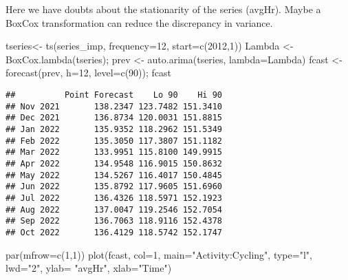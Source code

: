 \documentclass[
]{article}
\newenvironment{Shaded}{\begin{snugshade}}{\end{snugshade}}
\newcommand{\AttributeTok}[1]{\textcolor[rgb]{0.77,0.63,0.00}{#1}}
\newcommand{\DecValTok}[1]{\textcolor[rgb]{0.00,0.00,0.81}{#1}}
\newcommand{\FunctionTok}[1]{\textcolor[rgb]{0.00,0.00,0.00}{#1}}
\newcommand{\NormalTok}[1]{#1}
\newcommand{\OtherTok}[1]{\textcolor[rgb]{0.56,0.35,0.01}{#1}}
\newcommand{\StringTok}[1]{\textcolor[rgb]{0.31,0.60,0.02}{#1}}
\begin{document}
Here we have doubts about the stationarity of the series (avgHr). Maybe
a BoxCox transformation can reduce the discrepancy in variance.

\begin{Shaded}
\begin{Highlighting}[]
\NormalTok{tseries}\OtherTok{\textless{}{-}} \FunctionTok{ts}\NormalTok{(series\_imp, }\AttributeTok{frequency=}\DecValTok{12}\NormalTok{, }\AttributeTok{start=}\FunctionTok{c}\NormalTok{(}\DecValTok{2012}\NormalTok{,}\DecValTok{1}\NormalTok{))}
\NormalTok{Lambda }\OtherTok{\textless{}{-}} \FunctionTok{BoxCox.lambda}\NormalTok{(tseries); }
\NormalTok{prev }\OtherTok{\textless{}{-}} \FunctionTok{auto.arima}\NormalTok{(tseries, }\AttributeTok{lambda=}\NormalTok{Lambda) }
\NormalTok{fcast }\OtherTok{\textless{}{-}} \FunctionTok{forecast}\NormalTok{(prev, }\AttributeTok{h=}\DecValTok{12}\NormalTok{, }\AttributeTok{level=}\FunctionTok{c}\NormalTok{(}\DecValTok{90}\NormalTok{)); fcast}
\end{Highlighting}
\end{Shaded}

\begin{verbatim}
##          Point Forecast    Lo 90    Hi 90
## Nov 2021       138.2347 123.7482 151.3410
## Dec 2021       136.8734 120.0031 151.8815
## Jan 2022       135.9352 118.2962 151.5349
## Feb 2022       135.3050 117.3807 151.1182
## Mar 2022       133.9951 115.8100 149.9915
## Apr 2022       134.9548 116.9015 150.8632
## May 2022       134.5267 116.4017 150.4845
## Jun 2022       135.8792 117.9605 151.6960
## Jul 2022       136.4326 118.5971 152.1923
## Aug 2022       137.0047 119.2546 152.7054
## Sep 2022       136.7063 118.9116 152.4378
## Oct 2022       136.4129 118.5742 152.1747
\end{verbatim}

\begin{Shaded}
\begin{Highlighting}[]
\FunctionTok{par}\NormalTok{(}\AttributeTok{mfrow=}\FunctionTok{c}\NormalTok{(}\DecValTok{1}\NormalTok{,}\DecValTok{1}\NormalTok{))}
\FunctionTok{plot}\NormalTok{(fcast, }\AttributeTok{col=}\DecValTok{1}\NormalTok{, }\AttributeTok{main=}\StringTok{"Activity:Cycling"}\NormalTok{, }\AttributeTok{type=}\StringTok{"l"}\NormalTok{, }\AttributeTok{lwd=}\StringTok{"2"}\NormalTok{, }\AttributeTok{ylab=} \StringTok{"avgHr"}\NormalTok{, }\AttributeTok{xlab=}\StringTok{"Time"}\NormalTok{)}
\end{Highlighting}
\end{Shaded}
\end{document}
